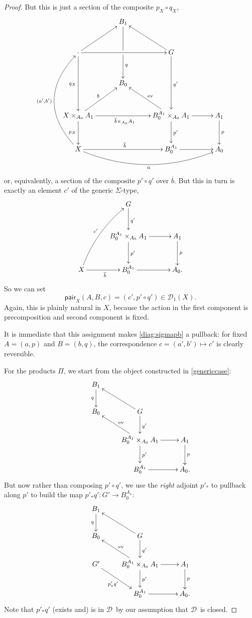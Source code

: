 \documentclass[12pt]{article}
\newcommand{\D}{\ensuremath{\mathcal{D}}}
\newcommand{\pairmap}{\ensuremath{\mathsf{pair}}}
\theoremstyle{definition}
\begin{document}
\begin{proof}
But this is just a section of the composite $p_X\circ q_X$,
\[
\xymatrix@=3em{
& B_1 \ar[dd] |\hole ^>>>>>>>{q} & &\\
\cdot \ar[ru] \ar[dd]_{q_X} \ar[rr] && \ar[lu] G \ar[dd]^{q'} & \\
& B_0 & &\\
X\times_{A_0} A_1\ar[ru]^{b} \ar[d]_{p_X}  \ar[rr]_{\overline{b}\times_{A_0}A_1} && \ar[lu]_{\mathrm{ev}} B_{0}^{A_1} \times_{A_0} A_1 \ar[d]^{p'} \ar[r] & A_1 \ar[d]^{p}\\
X \ar@/^8ex /[uuu]^{(a',b')} \ar[rr]^{\overline{b}} \ar@/_5ex /[rrr]_{a} && B_0^{A_1} \ar[r]  & A_0}
\]
or, equivalently, a section of the composite $p'\circ q'$ over $\overline{b}$.  But this in turn is exactly an element $c'$ of the generic $\Sigma$-type,
\[
\xymatrix@=3em{
&  G \ar[d]^{q'} & \\
& B_{0}^{A_1} \times_{A_0} A_1 \ar[d]^{p'} \ar[r] & A_1 \ar[d]^{p}\\
X \ar@/^2ex /[ruu]^{c'} \ar[r]_{\overline{b}} & B_0^{A_1} \ar[r]  & A_0.}
\]
So we can set $$\pairmap_X(A,B,c) = (c',p'\circ q')\in \D_1(X).$$
Again, this is plainly natural in $X$, because the action in the first component is precomposition and second component is fixed.

It is  immediate that this assignment makes \eqref{diag:sigmapb} a pullback: for fixed $A = (a, p)$ and  $B = (b, q)$, the correspondence $c=(a',b') \mapsto c'$ is clearly reversible.

For the products $\Pi$, we start from the object constructed in  \eqref{genericcase}:
\begin{equation*}%
\xymatrix{
& B_1 \ar[d]_{q} & &\\
& B_0 &  \ar[lu] G \ar[d]^{q'} & \\
&& \ar[lu]_{\mathrm{ev}} B_{0}^{A_1} \times_{A_0} A_1 \ar[d]^{p'} \ar[r] & A_1 \ar[d]^{p}\\
&& B_0^{A_1} \ar[r]  & A_0.}
\end{equation*}
But now rather than composing $p'\circ q'$, we use the \emph{right} adjoint $p'_*$ to pullback along $p'$ to build the map $p'_*q' : G' \to B_0^{A_1} $:
\begin{equation}\label{genericcase2}
\xymatrix{
& B_1 \ar[d]_{q} & &\\
& B_0 &  \ar[lu] G \ar[d]^{q'} & \\
&G' \ar[rd]_{p'_*q'} & \ar[lu]_{\mathrm{ev}} B_{0}^{A_1} \times_{A_0} A_1 \ar[d]^{p'} \ar[r] & A_1 \ar[d]^{p}\\
&& B_0^{A_1} \ar[r]  & A_0.}
\end{equation}
%
Note that $p'_*q'$ (exists and) is in \D\ by our assumption that \D\ is closed.


\end{proof}
\end{document}
